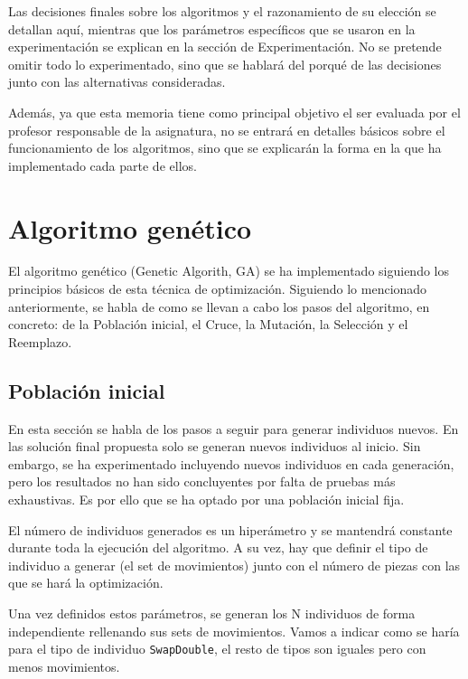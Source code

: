 \documentclass[11pt,spanish,listoffigures,listoftables]{tfgetsinf}
\begin{document}
Las decisiones finales sobre los algoritmos y el razonamiento de su elección se detallan aquí, mientras que los parámetros específicos que se usaron en la experimentación se explican en la sección de Experimentación. No se pretende omitir todo lo experimentado, sino que se hablará del porqué de las decisiones junto con las alternativas consideradas.

Además, ya que esta memoria tiene como principal objetivo el ser evaluada por el profesor responsable de la asignatura, no se entrará en detalles básicos sobre el funcionamiento de los algoritmos, sino que se explicarán la forma en la que ha implementado cada parte de ellos.

\section{Algoritmo genético}
El algoritmo genético (Genetic Algorith, GA) \cite{} se ha implementado siguiendo los principios básicos de esta técnica de optimización. Siguiendo lo mencionado anteriormente, se habla de como se llevan a cabo los pasos del algoritmo, en concreto: de la Población inicial, el Cruce, la Mutación, la Selección y el Reemplazo.

\subsection{Población inicial}
En esta sección se habla de los pasos a seguir para generar individuos nuevos. En las solución final propuesta solo se generan nuevos individuos al inicio. Sin embargo, se ha experimentado incluyendo nuevos individuos en cada generación, pero los resultados no han sido concluyentes por falta de pruebas más exhaustivas. Es por ello que se ha optado por una población inicial fija.

El número de individuos generados es un hiperámetro y se mantendrá constante durante toda la ejecución del algoritmo. A su vez, hay que definir el tipo de individuo a generar (el set de movimientos) junto con el número de piezas con las que se hará la optimización.

Una vez definidos estos parámetros, se generan los N individuos de forma independiente rellenando sus sets de movimientos. Vamos a indicar como se haría para el tipo de individuo \texttt{SwapDouble}, el resto de tipos son iguales pero con menos movimientos.
\end{document}
